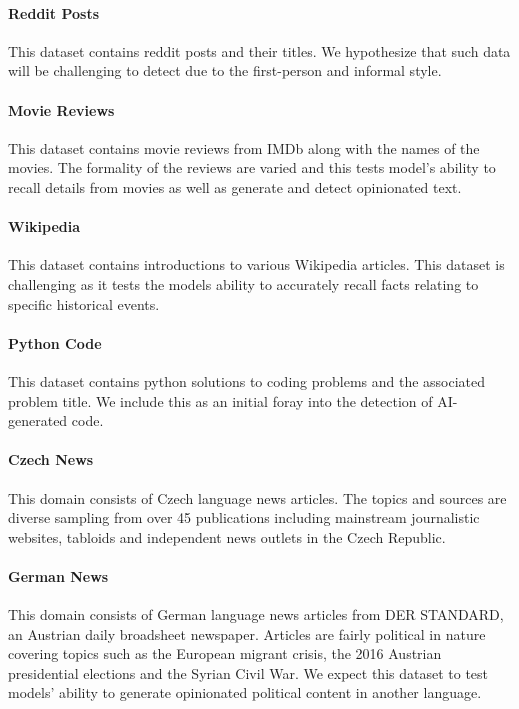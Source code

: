 \documentclass[11pt]{article}
\begin{document}
\paragraph{Reddit Posts} \cite{volske-etal-2017-tl} This dataset contains reddit posts and their titles. We hypothesize that such data will be challenging to detect due to the first-person and informal style.

\paragraph{Movie Reviews} \cite{maas-etal-2011-learning} This dataset contains movie reviews from IMDb along with the names of the movies. The formality of the reviews are varied and this tests model's ability to recall details from movies as well as generate and detect opinionated text.

\paragraph{Wikipedia} \cite{aaditya_bhat_2023} This dataset contains introductions to various Wikipedia articles. This dataset is challenging as it tests the models ability to accurately recall facts relating to specific historical events.

\paragraph{Python Code} \cite{raychev-etal-2016-probabilistic} This dataset contains python solutions to coding problems and the associated problem title. We include this as an initial foray into the detection of AI-generated code.

\paragraph{Czech News} \cite{boháček2022finegrained} This domain consists of Czech language news articles. The topics and sources are diverse sampling from over 45 publications including mainstream journalistic websites, tabloids and independent news outlets in the Czech Republic.

\paragraph{German News} \cite{dietmar-etal-2017-german} This domain consists of German language news articles from DER STANDARD, an Austrian daily broadsheet newspaper. Articles are fairly political in nature covering topics such as the European migrant crisis, the 2016 Austrian presidential elections and the Syrian Civil War. We expect this dataset to test models' ability to generate opinionated political content in another language.
\end{document}
